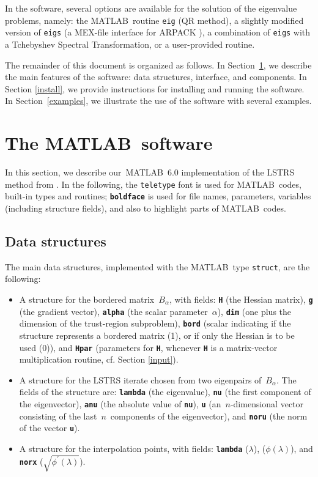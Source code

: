 \documentclass[acmtoms]{acmtrans2m}
\newcommand{\struct}{{\tt struct}}
\newcommand{\bord}{B_{\alpha}}
\newcommand{\philam}{\phi(\lambda)}
\newcommand{\dphilam}{\phi^{\prime}(\lambda)}
\newcommand{\matlab}{MATLAB}
\begin{document}
In the software, several options
are available for the solution of the eigenvalue problems, namely: the 
\matlab\ routine {\tt eig} (QR method), a slightly modified version of
{\tt eigs} (a MEX-file interface for ARPACK \cite{arpack}), a combination
of {\tt eigs} with a Tchebyshev Spectral Transformation,
or a user-provided routine.

The remainder of this document is organized as follows.
In Section~\ref{matlab}, we describe the main features of the software:
data structures, interface, and components. In Section \ref{install}, we provide
instructions for installing and running the software.
In Section~\ref{examples}, we illustrate the use of the software with several examples.


\section{The \matlab\ software}\label{matlab}

In this section, we describe our\ \matlab\ 6.0 implementation
of the LSTRS method from \cite{rss2000}. In the following, the
{\tt teletype} font is used for 
\matlab\ codes, built-in types and routines; {\tt\bf boldface}
is used for file names, parameters, variables (including structure fields), and
also to highlight parts of \matlab\ codes.

\subsection{Data structures}\label{datastructures}
The main data structures, implemented with the \matlab\ type \struct,
are the following:
\begin{itemize}
\item A structure for the bordered matrix\ $\bord$,
with fields: {\tt\bf H} (the Hessian matrix), {\tt\bf g} (the gradient vector),
{\tt\bf alpha} (the scalar parameter\ $\alpha$), {\tt\bf dim} (one plus the
dimension of the trust-region subproblem), {\tt\bf bord} (scalar indicating if
the structure represents a bordered matrix (1), or if only the Hessian
is to be used (0)), and {\tt\bf Hpar} (parameters for {\tt\bf H}, whenever
{\tt\bf H} is a matrix-vector multiplication routine, cf. Section \ref{input}).

\item A structure for the LSTRS iterate chosen from two eigenpairs of\ $\bord$.
The fields of the structure are: {\tt\bf lambda} (the eigenvalue), {\tt\bf nu} (the first component of the
eigenvector), {\tt\bf anu} (the absolute value of {\tt\bf nu}), {\tt\bf u}
(an\ $n$-dimensional vector consisting of the last\ $n$\ components of the eigenvector), and
{\tt\bf noru} (the norm of the vector {\tt\bf u}).

\item A structure for the interpolation points, with fields: {\tt\bf lambda} ($\lambda$), ($\philam$),
and {\tt\bf norx} ($\sqrt{\dphilam}$).

\end{itemize}
\end{document}
